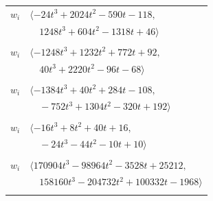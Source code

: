 \documentclass[11pt]{article}
\begin{document}
\begin{longtable}{@{}ll@{}}
$w_i$ & $\langle -24t^{3}+2024t^{2}-590t-118,$\\
 & $\quad 1248t^{3}+604t^{2}-1318t+46\rangle$\\
\addlinespace[2pt]
\multicolumn{2}{@{}p{0.97\textwidth}@{}}{$i=60$, $D_i=4$, $\rho_{ij}$: $2{:}2, \allowbreak 13{:}1, \allowbreak 15{:}2, \allowbreak 22{:}1, \allowbreak 26{:}2, \allowbreak 41{:}2, \allowbreak 44{:}2, \allowbreak 45{:}1, \allowbreak 52{:}2$}\\
$w_i$ & $\langle -1248t^{3}+1232t^{2}+772t+92,$\\
 & $\quad 40t^{3}+2220t^{2}-96t-68\rangle$\\
\addlinespace[2pt]
\multicolumn{2}{@{}p{0.97\textwidth}@{}}{$i=61$, $D_i=8$, $\rho_{ij}$: $2{:}1, \allowbreak 11{:}2, \allowbreak 19{:}1, \allowbreak 21{:}2, \allowbreak 22{:}1, \allowbreak 23{:}2, \allowbreak 26{:}2, \allowbreak 30{:}2, \allowbreak 33{:}1, \allowbreak 49{:}2, \allowbreak 55{:}1, \allowbreak 59{:}1$}\\
$w_i$ & $\langle -1384t^{3}+40t^{2}+284t-108,$\\
 & $\quad -752t^{3}+1304t^{2}-320t+192\rangle$\\
\addlinespace[2pt]
\multicolumn{2}{@{}p{0.97\textwidth}@{}}{$i=62$, $D_i=2$, $\rho_{ij}$: $2{:}2, \allowbreak 12{:}1, \allowbreak 18{:}1, \allowbreak 37{:}2, \allowbreak 57{:}2$}\\
$w_i$ & $\langle -16t^{3}+8t^{2}+40t+16,$\\
 & $\quad -24t^{3}-44t^{2}-10t+10\rangle$\\
\addlinespace[2pt]
\multicolumn{2}{@{}p{0.97\textwidth}@{}}{$i=63$, $D_i=972$, $e_i=0$, $\rho_{ij}$: $0{:}2, \allowbreak 9{:}2, \allowbreak 14{:}2, \allowbreak 15{:}2, \allowbreak 19{:}2, \allowbreak 46{:}2, \allowbreak 47{:}1, \allowbreak 57{:}2$}\\
$w_i$ & $\langle 170904t^{3}-98964t^{2}-3528t+25212,$\\
 & $\quad 158160t^{3}-204732t^{2}+100332t-1968\rangle$\\
\addlinespace[2pt]
\end{longtable}
\endgroup
\end{document}

